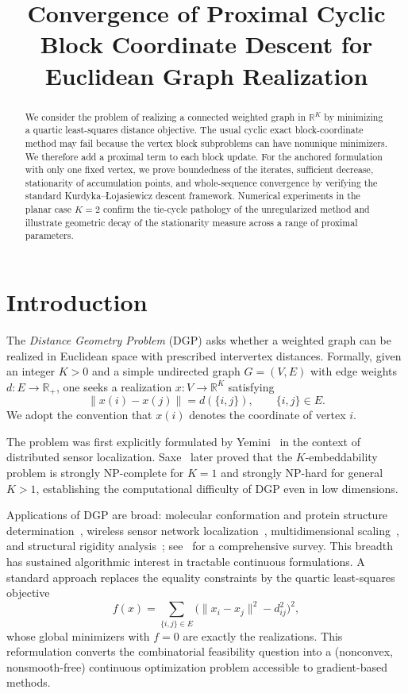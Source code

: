 \documentclass[11pt]{article}
\title{Convergence of Proximal Cyclic Block Coordinate Descent for Euclidean Graph Realization}
\date{}
\begin{document}
\maketitle

\begin{abstract}
We consider the problem of realizing a connected weighted graph in \(\mathbb R^K\) by minimizing a quartic least-squares distance objective.  The usual cyclic exact block-coordinate method may fail because the vertex block subproblems can have nonunique minimizers.  We therefore add a proximal term to each block update.  For the anchored formulation with only one fixed vertex, we prove boundedness of the iterates, sufficient decrease, stationarity of accumulation points, and whole-sequence convergence by verifying the standard Kurdyka--\L{}ojasiewicz descent framework.  Numerical experiments in the planar case \(K=2\) confirm the tie-cycle pathology of the unregularized method and illustrate geometric decay of the stationarity measure across a range of proximal parameters.
\end{abstract}

\section{Introduction}

The \emph{Distance Geometry Problem} (DGP) asks whether a weighted graph can be realized in Euclidean space with prescribed intervertex distances.  Formally, given an integer $K>0$ and a simple undirected graph $G=(V,E)$ with edge weights $d:E\to\mathbb R_+$, one seeks a realization $x:V\to\mathbb R^K$ satisfying
\[
    \|x(i)-x(j)\|=d(\{i,j\}),\qquad \{i,j\}\in E.
\]
We adopt the convention that $x(i)$ denotes the coordinate of vertex $i$.  

The problem was first explicitly formulated by Yemini~\cite{yemini1978} in the context of distributed sensor localization.  Saxe~\cite{saxe1979} later proved that the $K$-embeddability problem is strongly NP-complete for $K=1$ and strongly NP-hard for general $K>1$, establishing the computational difficulty of DGP even in low dimensions.

Applications of DGP are broad: molecular conformation and protein structure determination~\cite{crippen1988,more1999}, wireless sensor network localization~\cite{savvides2001}, multidimensional scaling~\cite{borgroenen2010}, and structural rigidity analysis~\cite{roth1981}; see~\cite{liberti2014} for a comprehensive survey.  This breadth has sustained algorithmic interest in tractable continuous formulations.  A standard approach replaces the equality constraints by the quartic least-squares objective
\[
    f(x)=\sum_{\{i,j\}\in E}\bigl(\|x_i-x_j\|^2-d_{ij}^2\bigr)^2,
\]
whose global minimizers with $f=0$ are exactly the realizations.  This reformulation converts the combinatorial feasibility question into a (nonconvex, nonsmooth-free) continuous optimization problem accessible to gradient-based methods.
\end{document}
